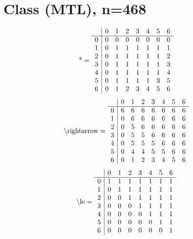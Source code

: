\documentclass[11pt]{article}
\begin{document}
\section{Class (MTL), n=468}
\[\text{*} = 
\begin{array}{r | r r r r r r r}
 & 0 & 1 & 2 & 3 & 4 & 5 & 6 \\ \hline
0 & 0 & 0 & 0 & 0 & 0 & 0 & 0 \\
1 & 0 & 1 & 1 & 1 & 1 & 1 & 1 \\
2 & 0 & 1 & 1 & 1 & 1 & 1 & 2 \\
3 & 0 & 1 & 1 & 1 & 1 & 1 & 3 \\
4 & 0 & 1 & 1 & 1 & 1 & 1 & 4 \\
5 & 0 & 1 & 1 & 1 & 1 & 3 & 5 \\
6 & 0 & 1 & 2 & 3 & 4 & 5 & 6 \\
\end{array}
\]
\[\text{\textbackslash rightarrow} = 
\begin{array}{r | r r r r r r r}
 & 0 & 1 & 2 & 3 & 4 & 5 & 6 \\ \hline
0 & 6 & 6 & 6 & 6 & 6 & 6 & 6 \\
1 & 0 & 6 & 6 & 6 & 6 & 6 & 6 \\
2 & 0 & 5 & 6 & 6 & 6 & 6 & 6 \\
3 & 0 & 5 & 5 & 6 & 6 & 6 & 6 \\
4 & 0 & 5 & 5 & 5 & 6 & 6 & 6 \\
5 & 0 & 4 & 4 & 5 & 5 & 6 & 6 \\
6 & 0 & 1 & 2 & 3 & 4 & 5 & 6 \\
\end{array}
\]
\[\text{\textbackslash le} = 
\begin{array}{r | r r r r r r r}
 & 0 & 1 & 2 & 3 & 4 & 5 & 6 \\ \hline
0 & 1 & 1 & 1 & 1 & 1 & 1 & 1 \\
1 & 0 & 1 & 1 & 1 & 1 & 1 & 1 \\
2 & 0 & 0 & 1 & 1 & 1 & 1 & 1 \\
3 & 0 & 0 & 0 & 1 & 1 & 1 & 1 \\
4 & 0 & 0 & 0 & 0 & 1 & 1 & 1 \\
5 & 0 & 0 & 0 & 0 & 0 & 1 & 1 \\
6 & 0 & 0 & 0 & 0 & 0 & 0 & 1 \\
\end{array}
\]
\end{document}
